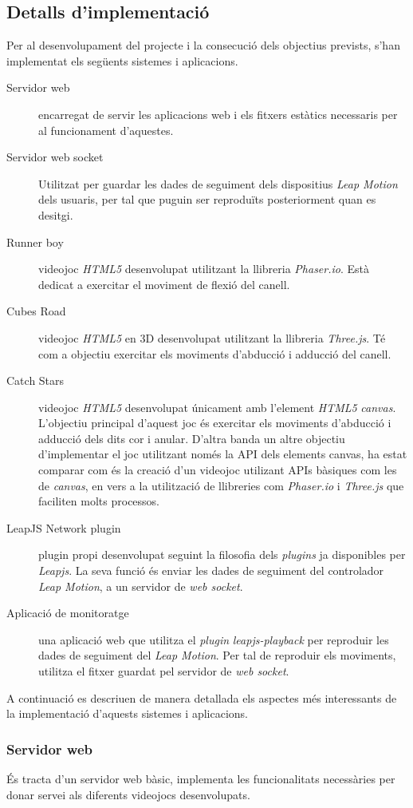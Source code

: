 \documentclass[12pt,a4paper,catalan]{article}
\begin{document}
	\subsection{Detalls d'implementació}
	Per al desenvolupament del projecte i la consecució dels objectius prevists, s'han implementat els següents sistemes i aplicacions.
	\begin{description}
		\item[Servidor web] encarregat de servir les aplicacions web i els fitxers estàtics necessaris per al funcionament d'aquestes.
		\item[Servidor web socket] Utilitzat per guardar les dades de seguiment dels dispositius \textit{Leap Motion} dels usuaris, per tal que puguin ser reproduïts posteriorment quan es desitgi.
		\item[Runner boy] videojoc \textit{HTML5} desenvolupat utilitzant la llibreria \textit{Phaser.io}. Està dedicat a exercitar el moviment de flexió del canell.
		\item[Cubes Road] videojoc \textit{HTML5} en 3D desenvolupat utilitzant la llibreria \textit{Three.js}. Té com a objectiu exercitar els moviments d'abducció i adducció del canell.
		\item[Catch Stars] videojoc \textit{HTML5} desenvolupat únicament amb l'element \textit{HTML5} \textit{canvas}. L'objectiu principal d'aquest joc és exercitar els moviments d'abducció i adducció dels dits cor i anular. D'altra banda un altre objectiu d'implementar el joc utilitzant només la API dels elements canvas, ha estat comparar com és la creació d'un videojoc utilizant APIs bàsiques com les de \textit{canvas}, en vers a la utilització de llibreries com \textit{Phaser.io} i \textit{Three.js} que faciliten molts processos.
		\item[LeapJS Network plugin] plugin propi desenvolupat seguint la filosofia dels \textit{plugins} ja disponibles per \textit{Leapjs}. La seva funció és enviar les dades de seguiment del controlador \textit{Leap Motion}, a un servidor de \textit{web socket}.
		\item[Aplicació de monitoratge] una aplicació web que utilitza el \textit{plugin} \textit{leapjs-playback} per reproduir les dades de seguiment del \textit{Leap Motion}. Per tal de reproduir els moviments, utilitza el fitxer guardat pel servidor de \textit{web socket}.
	\end{description}
	A continuació es descriuen de manera detallada els aspectes més interessants de la implementació d'aquests sistemes i aplicacions.
	\subsubsection{Servidor web}
	És tracta d'un servidor web bàsic, implementa les funcionalitats necessàries per donar servei als diferents videojocs desenvolupats.
	
\end{document}
